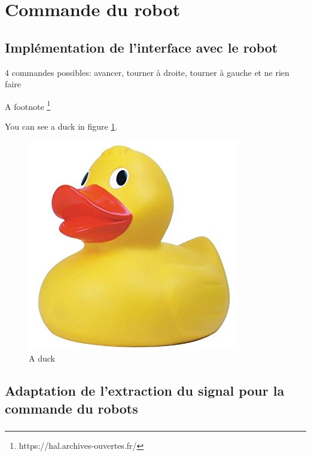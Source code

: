 \documentclass[11pt]{article}
\begin{document}

\section{Commande du robot}

 	  
\subsection{Implémentation de l'interface avec le robot}
4 commandes possibles: avancer, tourner à droite, tourner à gauche et ne rien faire

A footnote \footnote{https://hal.archives-ouvertes.fr/}

You can see a duck in figure \ref{fig:duck}.

\begin{figure}[!h]
\centering
\includegraphics[scale=0.3]{bidon.jpg}
\caption{A duck}
\label{fig:duck}
\end{figure}

\cleardoublepage

\subsection{Adaptation de l'extraction du signal pour la commande du robots}

\cleardoublepage

\subsubsection{} \label{Deep}

	
\subsubsection{}
\end{document}
